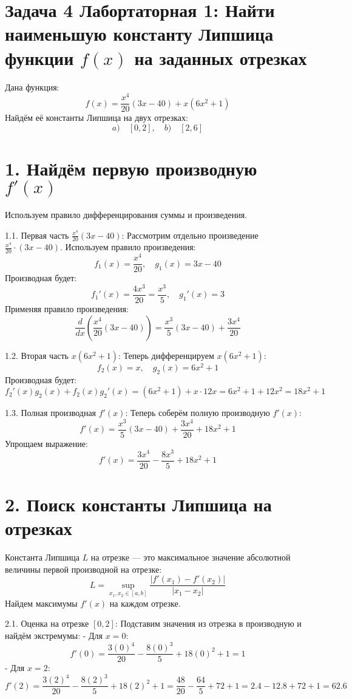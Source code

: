 \documentclass[a4paper,12pt]{article}
\begin{document}
\section*{Задача 4 Лабортаторная 1: Найти наименьшую константу Липшица функции \( f(x) \) на заданных отрезках}

Дана функция:
\[
f(x) = \frac{x^4}{20} (3x - 40) + x(6x^2 + 1)
\]
Найдём её константы Липшица на двух отрезках:
\[
a) \quad [0, 2], \quad b) \quad [2, 6]
\]

\section*{1. Найдём первую производную \( f'(x) \)}

Используем правило дифференцирования суммы и произведения. 

1.1. Первая часть \( \frac{x^4}{20}(3x - 40) \):
Рассмотрим отдельно произведение \( \frac{x^4}{20} \cdot (3x - 40) \). Используем правило произведения:
\[
f_1(x) = \frac{x^4}{20}, \quad g_1(x) = 3x - 40
\]
Производная будет:
\[
f_1'(x) = \frac{4x^3}{20} = \frac{x^3}{5}, \quad g_1'(x) = 3
\]
Применяя правило произведения:
\[
\frac{d}{dx} \left( \frac{x^4}{20}(3x - 40) \right) = \frac{x^3}{5}(3x - 40) + \frac{3x^4}{20}
\]

1.2. Вторая часть \( x(6x^2 + 1) \):
Теперь дифференцируем \( x(6x^2 + 1) \):
\[
f_2(x) = x, \quad g_2(x) = 6x^2 + 1
\]
Производная будет:
\[
f_2'(x)g_2(x) + f_2(x)g_2'(x) = (6x^2 + 1) + x \cdot 12x = 6x^2 + 1 + 12x^2 = 18x^2 + 1
\]

1.3. Полная производная \( f'(x) \):
Теперь соберём полную производную \( f'(x) \):
\[
f'(x) = \frac{x^3}{5}(3x - 40) + \frac{3x^4}{20} + 18x^2 + 1
\]
Упрощаем выражение:
\[
f'(x) = \frac{3x^4}{20} - \frac{8x^3}{5} + 18x^2 + 1
\]

\section*{2. Поиск константы Липшица на отрезках}

Константа Липшица \( L \) на отрезке — это максимальное значение абсолютной величины первой производной на отрезке:
\[
L = \sup_{x_1, x_2 \in [a, b]} \frac{|f'(x_1) - f'(x_2)|}{|x_1 - x_2|}
\]
Найдем максимумы \( f'(x) \) на каждом отрезке.

2.1. Оценка на отрезке \( [0, 2] \):
Подставим значения из отрезка в производную и найдём экстремумы:
- Для \( x = 0 \):
\[
f'(0) = \frac{3(0)^4}{20} - \frac{8(0)^3}{5} + 18(0)^2 + 1 = 1
\]
- Для \( x = 2 \):
\[
f'(2) = \frac{3(2)^4}{20} - \frac{8(2)^3}{5} + 18(2)^2 + 1 = \frac{48}{20} - \frac{64}{5} + 72 + 1 = 2.4 - 12.8 + 72 + 1 = 62.6
\]
\end{document}
